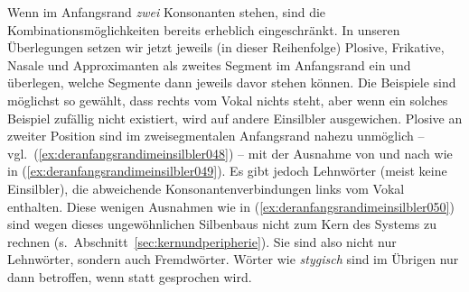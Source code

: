 \begin{exe}
  \ex\label{ex:deranfangsrandimeinsilbler042}
  \begin{xlist}
  \end{xlist}
\end{exe}

Wenn im Anfangsrand \textit{zwei} Konsonanten stehen, sind die Kombinationsmöglichkeiten bereits erheblich eingeschränkt.
In unseren Überlegungen setzen wir jetzt jeweils (in dieser Reihenfolge) Plosive, Frikative, Nasale und Approximanten als zweites Segment im Anfangsrand ein und überlegen, welche Segmente dann jeweils davor stehen können.
Die Beispiele sind möglichst so gewählt, dass rechts vom Vokal nichts steht, aber wenn ein solches Beispiel zufällig nicht existiert, wird auf andere Einsilbler ausgewichen.
Plosive an zweiter Position sind im zweisegmentalen Anfangsrand nahezu unmöglich -- vgl.\ (\ref{ex:deranfangsrandimeinsilbler048}) -- mit der Ausnahme von \textipa{[p]} und \textipa{[t]} nach \textipa{[S]} wie in (\ref{ex:deranfangsrandimeinsilbler049}).
Es gibt jedoch Lehnwörter (meist keine Einsilbler), die abweichende Konsonantenverbindungen links vom Vokal enthalten.
Diese wenigen Ausnahmen wie in (\ref{ex:deranfangsrandimeinsilbler050}) sind wegen dieses ungewöhnlichen Silbenbaus nicht zum Kern des Systems zu rechnen (s.\ Abschnitt~\ref{sec:kernundperipherie}).
Sie sind also nicht nur Lehnwörter, sondern auch Fremdwörter.
Wörter wie \textit{stygisch} sind im Übrigen nur dann betroffen, wenn \textipa{[st]} statt \textipa{[St]} gesprochen wird.

\begin{exe}
  \ex\label{ex:deranfangsrandimeinsilbler047}
  \begin{xlist}
  \end{xlist}
\end{exe}

